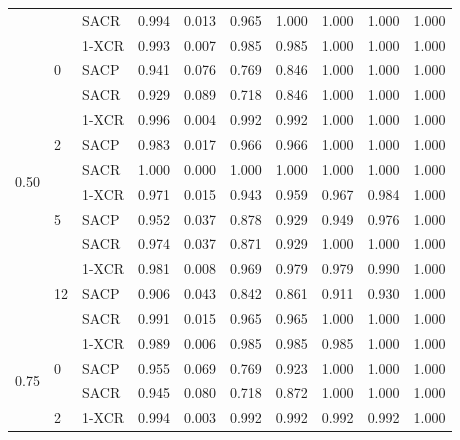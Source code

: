 \begin{longtable}[c]{@{}llllllllll@{}}
                        &                     & SACR   & 0.994 & 0.013 & 0.965 & 1.000 & 1.000 & 1.000 & 1.000 \\* \cmidrule(l){2-10} 
\multirow{12}{*}{0.50} & \multirow{3}{*}{0}  & 1-XCR  & 0.993 & 0.007 & 0.985 & 0.985 & 1.000 & 1.000 & 1.000 \\
                        &                     & SACP   & 0.941 & 0.076 & 0.769 & 0.846 & 1.000 & 1.000 & 1.000 \\
                        &                     & SACR   & 0.929 & 0.089 & 0.718 & 0.846 & 1.000 & 1.000 & 1.000 \\* \cmidrule(l){3-10} 
                        & \multirow{3}{*}{2}  & 1-XCR  & 0.996 & 0.004 & 0.992 & 0.992 & 1.000 & 1.000 & 1.000 \\
                        &                     & SACP   & 0.983 & 0.017 & 0.966 & 0.966 & 1.000 & 1.000 & 1.000 \\
                        &                     & SACR   & 1.000 & 0.000 & 1.000 & 1.000 & 1.000 & 1.000 & 1.000 \\* \cmidrule(l){3-10} 
                        & \multirow{3}{*}{5}  & 1-XCR  & 0.971 & 0.015 & 0.943 & 0.959 & 0.967 & 0.984 & 1.000 \\
                        &                     & SACP   & 0.952 & 0.037 & 0.878 & 0.929 & 0.949 & 0.976 & 1.000 \\
                        &                     & SACR   & 0.974 & 0.037 & 0.871 & 0.929 & 1.000 & 1.000 & 1.000 \\* \cmidrule(l){3-10} 
                        & \multirow{3}{*}{12} & 1-XCR  & 0.981 & 0.008 & 0.969 & 0.979 & 0.979 & 0.990 & 1.000 \\
                        &                     & SACP   & 0.906 & 0.043 & 0.842 & 0.861 & 0.911 & 0.930 & 1.000 \\
                        &                     & SACR   & 0.991 & 0.015 & 0.965 & 0.965 & 1.000 & 1.000 & 1.000 \\* \cmidrule(l){2-10} 
\multirow{12}{*}{0.75} & \multirow{3}{*}{0}  & 1-XCR  & 0.989 & 0.006 & 0.985 & 0.985 & 0.985 & 1.000 & 1.000 \\
                        &                     & SACP   & 0.955 & 0.069 & 0.769 & 0.923 & 1.000 & 1.000 & 1.000 \\
                        &                     & SACR   & 0.945 & 0.080 & 0.718 & 0.872 & 1.000 & 1.000 & 1.000 \\* \cmidrule(l){3-10} 
                        & \multirow{3}{*}{2}  & 1-XCR  & 0.994 & 0.003 & 0.992 & 0.992 & 0.992 & 0.992 & 1.000 \\

\end{longtable}
